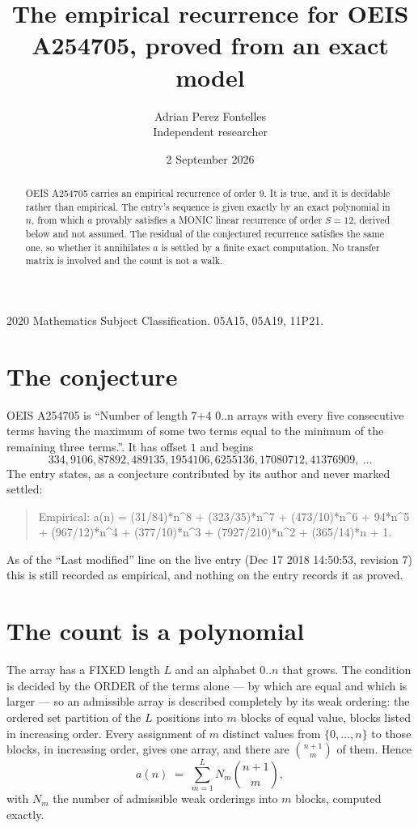 \documentclass[11pt,a4paper]{article}
\title{The empirical recurrence for OEIS A254705, proved from an exact model}
\author{Adrian Perez Fontelles\\ \small Independent researcher}
\date{2 September 2026}
\theoremstyle{plain}
\theoremstyle{definition}
\begin{document}
\maketitle

\begin{abstract}
OEIS A254705 carries an empirical recurrence of order $9$. It is true, and it is
decidable rather than empirical. The entry's sequence is given exactly by an exact polynomial in $n$, from
which $a$ provably satisfies a MONIC linear recurrence of order $S=12$, derived below and not
assumed. The residual of the conjectured recurrence satisfies the same one, so whether it
annihilates $a$ is settled by a finite exact computation. No transfer matrix is involved and
the count is not a walk.
\end{abstract}

\noindent\small 2020 Mathematics Subject Classification. 05A15, 05A19, 11P21.\normalsize

\section{The conjecture}

OEIS A254705 is ``Number of length 7+4 0..n arrays with every five consecutive terms having the maximum of some two terms equal to the minimum of the remaining three terms.''. It has offset $1$ and begins
\[
334, 9106, 87892, 489135, 1954106, 6255136, 17080712, 41376909,\ \dots
\]
The entry states, as a conjecture contributed by its author and never marked settled:
\begin{quote}
Empirical: a(n) = (31/84)*n\^{}8 + (323/35)*n\^{}7 + (473/10)*n\^{}6 + 94*n\^{}5 + (967/12)*n\^{}4 + (377/10)*n\^{}3 + (7927/210)*n\^{}2 + (365/14)*n + 1.
\end{quote}
As of the ``Last modified'' line on the live entry (Dec 17 2018 14:50:53, revision 7)
this is still recorded as empirical, and nothing on the entry records it as proved.

\section{The count is a polynomial}

The array has a FIXED length $L$ and an alphabet $0..n$ that grows. The condition is decided by
the ORDER of the terms alone --- by which are equal and which is larger --- so an admissible
array is described completely by its weak ordering: the ordered set partition of the $L$
positions into $m$ blocks of equal value, blocks listed in increasing order. Every assignment
of $m$ distinct values from $\{0,\dots,n\}$ to those blocks, in increasing order, gives one
array, and there are $\binom{n+1}{m}$ of them. Hence
\[
a(n)\;=\;\sum_{m=1}^{L} N_m\binom{n+1}{m},
\]
with $N_m$ the number of admissible weak orderings into $m$ blocks, computed exactly.
\end{document}
